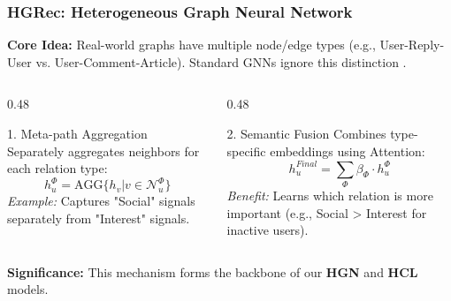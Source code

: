 \documentclass{beamer}
\begin{document}
\begin{frame}
    \frametitle{HGRec: Heterogeneous Graph Neural Network}
    \textbf{Core Idea:} Real-world graphs have multiple node/edge types (e.g., User-Reply-User vs. User-Comment-Article). Standard GNNs ignore this distinction \cite{shi2020hgrec}.

    \vspace{0.1cm}
    \begin{columns}
        \begin{column}{0.48\textwidth}
            \begin{block}{1. Meta-path Aggregation}
                Separately aggregates neighbors for each relation type:
                \[ h_u^{\Phi} = \text{AGG}\{h_v | v \in \mathcal{N}_u^{\Phi}\} \]
                \textit{Example:} Captures "Social" signals separately from "Interest" signals.
            \end{block}
        \end{column}

        \begin{column}{0.48\textwidth}
            \begin{block}{2. Semantic Fusion}
                Combines type-specific embeddings using Attention:
                \[ h_u^{Final} = \sum_{\Phi} \beta_{\Phi} \cdot h_u^{\Phi} \]
                \textit{Benefit:} Learns which relation is more important (e.g., Social > Interest for inactive users).
            \end{block}
        \end{column}
    \end{columns}

    \vspace{0.2cm}
    \textbf{Significance:} This mechanism forms the backbone of our \textbf{HGN} and \textbf{HCL} models.
\end{frame}
\end{document}
